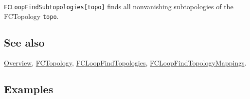 \documentclass[../FeynCalcManual.tex]{subfiles}
\begin{document}
\texttt{FCLoopFindSubtopologies[\allowbreak{}topo]} finds all
nonvanishing subtopologies of the FCTopology \texttt{topo}.

\subsection{See also}

\hyperlink{toc}{Overview}, \hyperlink{fctopology}{FCTopology},
\hyperlink{fcloopfindtopologies}{FCLoopFindTopologies},
\hyperlink{fcloopfindtopologymappings}{FCLoopFindTopologyMappings}.

\subsection{Examples}

\begin{Shaded}
\begin{Highlighting}[]
\ExtensionTok{=}\OperatorTok{[}\OperatorTok{[}\OperatorTok{,} \OperatorTok{\{}\OperatorTok{[\{\{}\OperatorTok{,} \OperatorTok{\},} \OperatorTok{\{}\OperatorTok{,} \OperatorTok{\},} \OperatorTok{\}],} 
\OperatorTok{[\{\{}\OperatorTok{,} \OperatorTok{\},} \OperatorTok{\{}\OperatorTok{,} \OperatorTok{\},} \OperatorTok{\}],}\OperatorTok{[\{\{}\SpecialCharTok{+}\OperatorTok{,} \OperatorTok{\},} \OperatorTok{\{}\OperatorTok{,} \OperatorTok{\},} \OperatorTok{\}],}\OperatorTok{[\{\{}\SpecialCharTok{+}\SpecialCharTok{+}\OperatorTok{,} \OperatorTok{\},} 
        \OperatorTok{\{}\OperatorTok{,} \OperatorTok{\},} \OperatorTok{\}],}\OperatorTok{[\{\{}\SpecialCharTok{{-}}\SpecialCharTok{+}\OperatorTok{,} \OperatorTok{\},} \OperatorTok{\{}\OperatorTok{,} \OperatorTok{\},} \OperatorTok{\}],}\OperatorTok{[\{\{}\SpecialCharTok{{-}}\SpecialCharTok{{-}}\SpecialCharTok{+}\OperatorTok{,} \OperatorTok{\},} \OperatorTok{\{}\OperatorTok{,} \OperatorTok{\},} \OperatorTok{\}]\},} 
     \OperatorTok{\{}\OperatorTok{,}\OperatorTok{\},} \OperatorTok{\{}\OperatorTok{,}\OperatorTok{\},} \OperatorTok{\{\},} \OperatorTok{\{\}]]}\NormalTok{;}
\end{Highlighting}
\end{Shaded}
\end{document}
